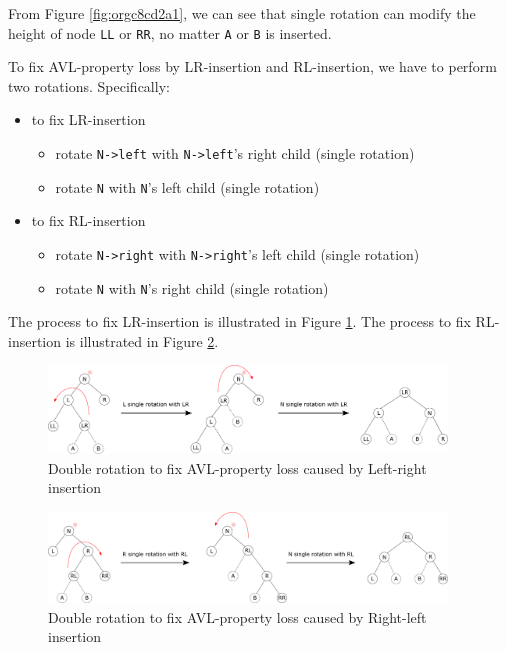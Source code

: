 \documentclass[12pt]{book}
\begin{document}
From Figure \ref{fig:orgc8cd2a1}, we can see that single rotation can modify the height of node \texttt{LL} or \texttt{RR}, no matter \texttt{A} or \texttt{B} is inserted.


To fix AVL-property loss by LR-insertion and RL-insertion, we have to perform two rotations. Specifically:
\begin{itemize}
\item to fix LR-insertion
\begin{itemize}
\item rotate \texttt{N->left} with \texttt{N->left}'s right child (single rotation)
\item rotate \texttt{N} with \texttt{N}'s left child (single rotation)
\end{itemize}
\item to fix RL-insertion
\begin{itemize}
\item rotate \texttt{N->right} with \texttt{N->right}'s left child (single rotation)
\item rotate \texttt{N} with \texttt{N}'s right child (single rotation)
\end{itemize}
\end{itemize}

The process to fix LR-insertion is illustrated in Figure \ref{fig:org5a0b9d0}. The process to fix RL-insertion is illustrated in Figure \ref{fig:org9eef5b9}.

\begin{figure}[htbp]
\centering
\includegraphics[width=400px]{./img/AVL-LR-insertion-fix.pdf}
\caption[Figure]{\label{fig:org5a0b9d0}
Double rotation to fix AVL-property loss caused by Left-right insertion}
\end{figure}

\begin{figure}[htbp]
\centering
\includegraphics[width=400px]{./img/AVL-RL-insertion-fix.pdf}
\caption[Figure]{\label{fig:org9eef5b9}
Double rotation to fix AVL-property loss caused by Right-left insertion}
\end{figure}
\end{document}
